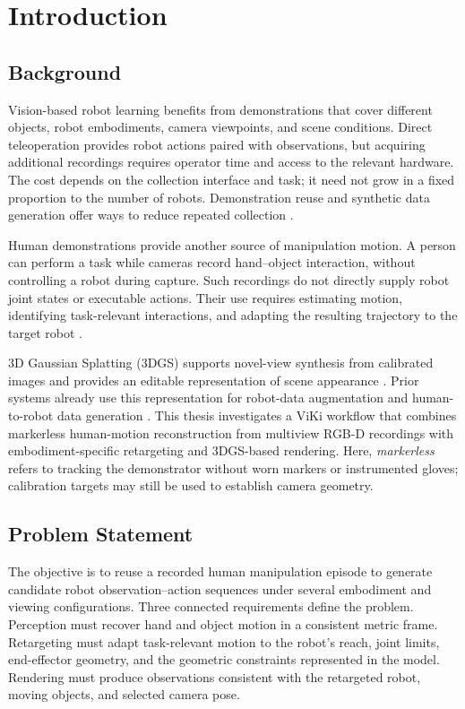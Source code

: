 \chapter{Introduction}
\label{ch:intro}

\section{Background}
\label{sec:background}

Vision-based robot learning benefits from demonstrations that cover different
objects, robot embodiments, camera viewpoints, and scene conditions. Direct
teleoperation provides robot actions paired with observations, but acquiring
additional recordings requires operator time and access to the relevant
hardware. The cost depends on the collection interface and task; it need not
grow in a fixed proportion to the number of robots. Demonstration reuse and
synthetic data generation offer ways to reduce repeated collection
\cite{mimicgen, real2render2real}.

Human demonstrations provide another source of manipulation motion. A person
can perform a task while cameras record hand--object interaction, without
controlling a robot during capture. Such recordings do not directly supply
robot joint states or executable actions. Their use requires estimating motion,
identifying task-relevant interactions, and adapting the resulting trajectory
to the target robot \cite{dexmv, okami}.

3D Gaussian Splatting (3DGS) supports novel-view synthesis from calibrated
images and provides an editable representation of scene appearance
\cite{gaussiansplatting}. Prior systems already use this representation for
robot-data augmentation and human-to-robot data generation
\cite{robosplat, real2render2real, robopaint}.
This thesis investigates a ViKi workflow that combines markerless human-motion
reconstruction from multiview RGB-D recordings with embodiment-specific
retargeting and 3DGS-based rendering. Here, \emph{markerless} refers to tracking
the demonstrator without worn markers or instrumented gloves; calibration
targets may still be used to establish camera geometry.

\section{Problem Statement}
\label{sec:problem}

The objective is to reuse a recorded human manipulation episode to generate
candidate robot observation--action sequences under several embodiment and
viewing configurations. Three connected requirements define the problem.
Perception must recover hand and object motion in a consistent metric frame.
Retargeting must adapt task-relevant motion to the robot's reach, joint limits,
end-effector geometry, and the geometric constraints represented in the model.
Rendering must produce observations consistent with the retargeted robot,
moving objects, and selected camera pose.

